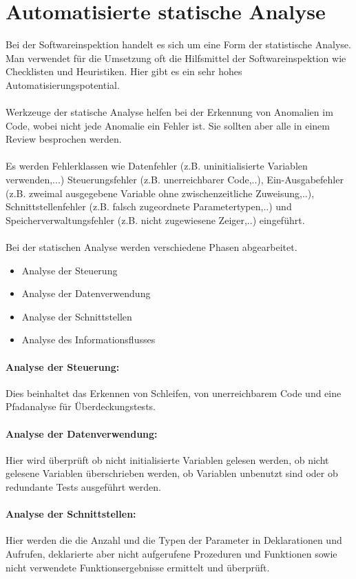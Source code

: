 \section{Automatisierte statische Analyse}
Bei der Softwareinspektion handelt es sich um eine Form der statistische Analyse. Man verwendet für die Umsetzung oft die Hilfsmittel der Softwareinspektion wie Checklisten und Heuristiken. Hier gibt es ein sehr hohes Automatisierungspotential. 
\\\\
Werkzeuge der statische Analyse helfen bei der Erkennung von Anomalien im Code, wobei nicht jede Anomalie ein Fehler ist. Sie sollten aber alle in einem Review besprochen werden.
\\\\
Es werden Fehlerklassen wie Datenfehler (z.B. uninitialisierte Variablen verwenden,...) Steuerungsfehler (z.B. unerreichbarer Code,..), Ein-Ausgabefehler (z.B. zweimal ausgegebene Variable ohne zwischenzeitliche Zuweisung,..), Schnittstellenfehler (z.B. falsch zugeordnete Parametertypen,..) und Speicherverwaltungsfehler (z.B. nicht zugewiesene Zeiger,..) eingeführt.
\\\\
Bei der statischen Analyse werden verschiedene Phasen abgearbeitet. 
\begin{itemize}
\item Analyse der Steuerung
\item Analyse der Datenverwendung
\item Analyse der Schnittstellen
\item Analyse des Informationsflusses
\end{itemize}

\paragraph{Analyse der Steuerung:} Dies beinhaltet das Erkennen von Schleifen, von unerreichbarem Code  und eine Pfadanalyse für Überdeckungstests.

\paragraph{Analyse der Datenverwendung:} Hier wird überprüft ob nicht initialisierte Variablen gelesen werden, ob nicht gelesene Variablen überschrieben werden, ob Variablen unbenutzt sind oder ob redundante Tests ausgeführt werden.

\paragraph{Analyse der Schnittstellen:} Hier werden die die Anzahl und die Typen der Parameter in Deklarationen und Aufrufen, deklarierte aber nicht aufgerufene Prozeduren und Funktionen sowie nicht verwendete Funktionsergebnisse ermittelt und überprüft.

